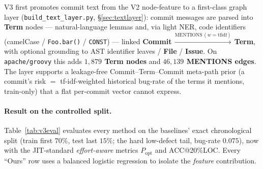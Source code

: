 \documentclass[11pt,a4paper]{article}
\newcommand{\node}[1]{\textcolor{kgblue}{\textbf{#1}}}
\newcommand{\edge}[1]{\textsc{#1}}
\begin{document}
	V3 first promotes commit text from the V2 node-feature to a first-class graph layer
	(\texttt{build\_text\_layer.py}, \S\ref{sec:textlayer}): commit messages are parsed
	into \node{Term} nodes --- natural-language lemmas and, via light NER, code
	identifiers (camelCase / \texttt{Foo.bar()} / \texttt{CONST}) --- linked
	\node{Commit}\,$\xrightarrow{\text{MENTIONS}\,(w=\text{tfidf})}$\,\node{Term}, with
	optional grounding to AST identifier leaves / \node{File} / \node{Issue}. On
	\texttt{apache/groovy} this adds \textbf{$1{,}879$ \node{Term} nodes} and
	\textbf{$46{,}139$ \edge{MENTIONS} edges}. The layer supports a leakage-free
	Commit--Term--Commit meta-path prior (a commit's risk $=$ tf-idf-weighted historical
	bug-rate of the terms it mentions, train-only) that a flat per-commit vector cannot
	express.

	\paragraph{Result on the controlled split.} Table~\ref{tab:v3eval} evaluates every
	method on the baselines' exact chronological split (train first $70\%$, test last
	$15\%$; the hard low-defect tail, bug-rate $0.075$), now with the JIT-standard
	\emph{effort-aware} metrics $P_{\mathrm{opt}}$ and ACC@20\%LOC. Every ``Ours'' row
	uses a balanced logistic regression to isolate the \emph{feature} contribution.
\end{document}
